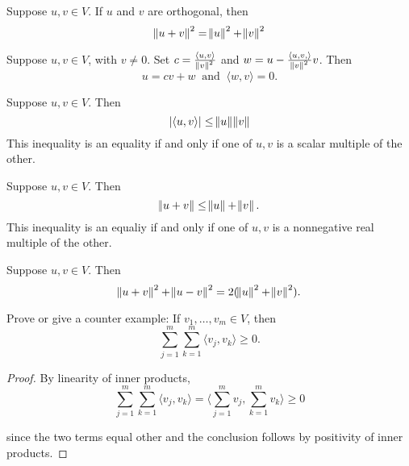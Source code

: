 \documentclass{extarticle}
\begin{document}
\begin{thm}
    Suppose \(u, v \in V\). If \(u\) and \(v\) are orthogonal, then 
    \[\norm{u + v}^2 = \norm{u}^2 + \norm{v}^2\]
\end{thm}

\begin{lemma}
    Suppose \( u, v \in V\), with \(v \neq 0\). Set \(c = \frac{\langle u,v \rangle}{\norm{v}^2}\) and 
    \(w = u - \frac{\langle u, v, \rangle}{\norm{v}^2}v\). Then 
    \[u = cv+w \ \text{ and } \ \langle w,v \rangle = 0.\]
\end{lemma}

\begin{thm}
    Suppose \(u, v \in V\). Then 
    \[|\langle u,v \rangle| \leq \norm{ u } \norm{ v }\]
    This inequality is an equality if and only if one of \(u, v\) is a scalar multiple of the other.
\end{thm}


\begin{thm}
    Suppose \(u, v \in V\). Then 
    \[\norm{ u+v }\leq \norm{ u } + \norm{ v }.\] 
    This inequality is an equaliy if and only if one of \(u, v\) is a nonnegative real multiple of the other.
\end{thm}


\begin{thm}
    Suppose \(u, v \in V\). Then 
    \[\norm{ u +v }^2 + \norm{ u-v }^2 = 2(\norm{u}^2 + \norm{v}^2).\]
\end{thm}



\newpage 
{}

\begin{problem}{1}
    Prove or give a counter example: If \(v_1, \ldots, v_m \in V\), then 
    \[\sum_{j=1}^{m}\sum_{k=1}^{m} \langle v_j,v_k \rangle \geq 0.\]
\end{problem}

\begin{proof}
By linearity of inner products, 
\[\sum_{j=1}^{m}\sum_{k=1}^{m} \langle v_j,v_k \rangle 
= \langle \sum_{j=1}^{m} v_j, \sum_{k=1}^{m} v_k \rangle \geq 0\]

since the two terms equal other and the conclusion follows by positivity of inner products.
\end{proof}
\end{document}
